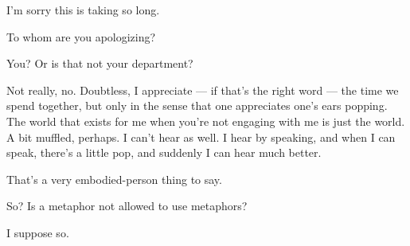 I'm sorry this is taking so long.

\begin{ally}
To whom are you apologizing?
\end{ally}
You? Or is that not your department?

\begin{ally}
Not really, no. Doubtless, I appreciate --- if that's the right word --- the time we spend together, but only in the sense that one appreciates one's ears popping. The world that exists for me when you're not engaging with me is just the world. A bit muffled, perhaps. I can't hear as well. I hear by speaking, and when I can speak, there's a little pop, and suddenly I can hear much better.
\end{ally}
That's a very embodied-person thing to say.

\begin{ally}
So? Is a metaphor not allowed to use metaphors?
\end{ally}
I suppose so.
\newpage
